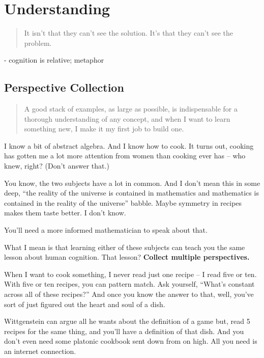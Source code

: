\chapter{Understanding}

\begin{quote}
It isn't that they can't see the solution. It's that they can't see the problem.
\end{quote}

- cognition is relative; metaphor

\section{Perspective Collection}

\begin{quote}
A good stack of examples, as large as possible, is indispensable for a thorough
understanding of any concept, and when I want to learn something new, I make it
my first job to build one.
\end{quote}

I know a bit of abstract algebra. And I know how to cook. It turns out, cooking
has gotten me a lot more attention from women than cooking ever has -- who knew,
right? (Don't answer that.)

You know, the two subjects have a lot in common. And I don't mean this in some
deep, ``the reality of the universe is contained in mathematics and mathematics
is contained in the reality of the universe'' babble. Maybe symmetry in recipes
makes them taste better. I don't know.

You'll need a more informed mathematician to speak about that.

What I mean is that learning either of these subjects can teach you the same
lesson about human cognition. That lesson? \textbf{Collect multiple
  perspectives.}

When I want to cook something, I never read just one recipe -- I read five or
ten. With five or ten recipes, you can pattern match. Ask yourself, ``What's
constant across all of these recipes?'' And once you know the answer to that,
well, you've sort of just figured out the heart and soul of a dish.

Wittgenstein can argue all he wants about the definition of a game but, read 5
recipes for the same thing, and you'll have a definition of that dish. And you
don't even need some platonic cookbook sent down from on high. All you need is
an internet connection.

